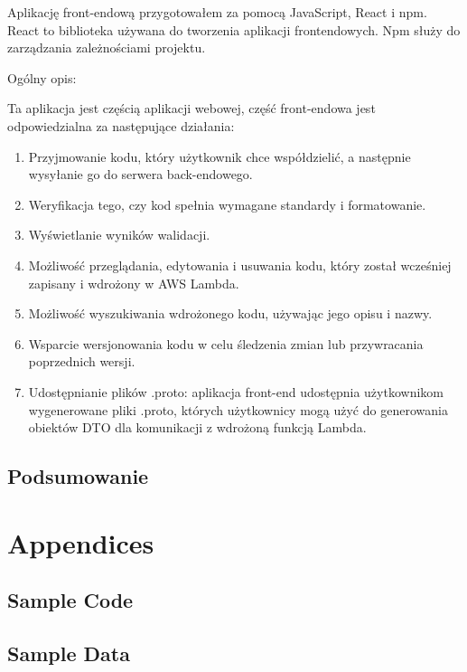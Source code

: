 \documentclass[runningheads,12pt]{llncs}
\begin{document}
Aplikację front-endową przygotowałem za pomocą JavaScript, React i npm.  
React to biblioteka używana do tworzenia aplikacji frontendowych.  
Npm służy do zarządzania zależnościami projektu.

Ogólny opis:

Ta aplikacja jest częścią aplikacji webowej, część front-endowa jest odpowiedzialna za następujące działania:
\begin{enumerate}
    \item Przyjmowanie kodu, który użytkownik chce współdzielić, a następnie wysyłanie go do serwera back-endowego.
    \item Weryfikacja tego, czy kod spełnia wymagane standardy i formatowanie.
    \item Wyświetlanie wyników walidacji.
    \item Możliwość przeglądania, edytowania i usuwania kodu, który został wcześniej zapisany i wdrożony w AWS Lambda.
    \item Możliwość wyszukiwania wdrożonego kodu, używając jego opisu i nazwy.
    \item Wsparcie wersjonowania kodu w celu śledzenia zmian lub przywracania poprzednich wersji.
    \item Udostępnianie plików .proto: aplikacja front-end udostępnia użytkownikom wygenerowane pliki .proto, których użytkownicy mogą użyć do generowania obiektów DTO dla komunikacji z wdrożoną funkcją Lambda.
\end{enumerate}

\subsection{Podsumowanie}

\nocite{*}

\listoftables

\listoffigures




\section{Appendices}

\subsection{Sample Code}
\subsection{Sample Data}
\end{document}
